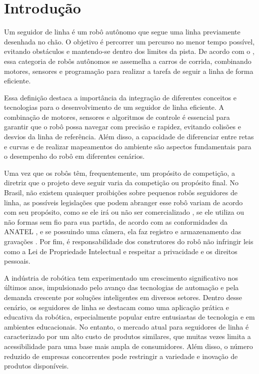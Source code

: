 \chapter{Introdução}

Um seguidor de linha é um robô autônomo que segue uma linha previamente
desenhada no chão. O objetivo é percorrer um percurso no menor tempo possível,
evitando obstáculos e mantendo-se dentro dos limites da pista. De acordo com o
\citeauthor{INATEL:Seguidor-de-Linha}, essa categoria de robôs autônomos
se assemelha a carros de corrida, combinando motores, sensores e programação
para realizar a tarefa de seguir a linha de forma eficiente.

Essa definição destaca a importância da integração de diferentes conceitos e
tecnologias para o desenvolvimento de um seguidor de linha eficiente. A
combinação de motores, sensores e algoritmos de controle é essencial para
garantir que o robô possa navegar com precisão e rapidez, evitando colisões e
desvios da linha de referência. Além disso, a capacidade de diferenciar entre
retas e curvas e de realizar mapeamentos do ambiente são aspectos fundamentais
para o desempenho do robô em diferentes cenários.

Uma vez que os robôs têm, frequentemente, um propósito de competição, a diretriz
que o projeto deve seguir varia da competição ou propósito final. No Brasil, não
existem quaisquer proibições sobre pequenos robôs seguidores de linha, as
possíveis legislações que podem abranger esse robô variam de acordo com seu
propósito, como se ele irá ou não ser comercializado \cite{Lei:8078:1990}, se
ele utiliza ou não formas sem fio para sua partida, de acordo com as
conformidades da ANATEL \cite{ANATEL:Manual-de-Orientacoes}, e se possuindo uma
câmera, ela faz registro e armazenamento das gravações \cite{Lei:12651:2012}.
Por fim, é responsabilidade dos construtores do robô não infringir leis como a
Lei de Propriedade Intelectual \cite{Lei:9279:1996} e respeitar a privacidade e
os direitos pessoais.

A indústria de robótica tem experimentado um crescimento significativo nos
últimos anos, impulsionado pelo avanço das tecnologias de automação e pela
demanda crescente por soluções inteligentes em diversos setores. Dentro desse
cenário, os seguidores de linha se destacam como uma aplicação prática e
educativa da robótica, especialmente popular entre entusiastas de tecnologia e
em ambientes educacionais. No entanto, o mercado atual para seguidores de linha
é caracterizado por um alto custo de produtos similares, que muitas vezes limita
a acessibilidade para uma base mais ampla de consumidores. Além disso, o número
reduzido de empresas concorrentes pode restringir a variedade e inovação de
produtos disponíveis.

